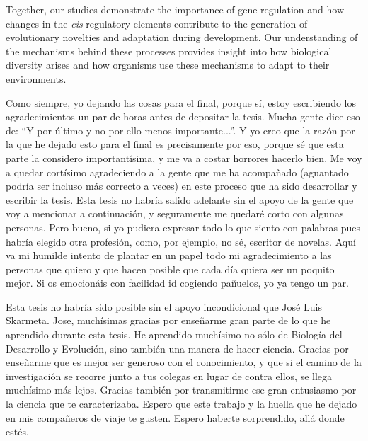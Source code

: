 \documentclass[
11pt, %
english, %
singlespacing, %
headsepline, %
chapterinoneline, %
]{MastersDoctoralThesis} %
\begin{document}
\begin{abstractLite}
Together, our studies demonstrate the importance of gene regulation and how changes in the \textit{cis} regulatory elements contribute to the generation of evolutionary novelties and adaptation during development. Our understanding of the mechanisms behind these processes provides insight into how biological diversity arises and how organisms use these mechanisms to adapt to their environments.
\end{abstractLite}






\begin{acknowledgements}
\addchaptertocentry{\acknowledgementname} %
Como siempre, yo dejando las cosas para el final, porque sí, estoy escribiendo los agradecimientos un par de horas antes de depositar la tesis. Mucha gente dice eso de: “Y por último y no por ello menos importante...”. Y yo creo que la razón por la que he dejado esto para el final es precisamente por eso, porque sé que esta parte la considero importantísima, y me va a costar horrores hacerlo bien. Me voy a quedar cortísimo agradeciendo a la gente que me ha acompañado (aguantado podría ser incluso más correcto a veces) en este proceso que ha sido desarrollar y escribir la tesis. Esta tesis no habría salido adelante sin el apoyo de la gente que voy a mencionar a continuación, y seguramente me quedaré corto con algunas personas. Pero bueno, si yo pudiera expresar todo lo que siento con palabras pues habría elegido otra profesión, como, por ejemplo, no sé, escritor de novelas. Aquí va mi humilde intento de plantar en un papel todo mi agradecimiento a las personas que quiero y que hacen posible que cada día quiera ser un poquito mejor. Si os emocionáis con facilidad id cogiendo pañuelos, yo ya tengo un par.  

Esta tesis no habría sido posible sin el apoyo incondicional que José Luis Skarmeta. Jose, muchísimas gracias por enseñarme gran parte de lo que he aprendido durante esta tesis. He aprendido muchísimo no sólo de Biología del Desarrollo y Evolución, sino también una manera de hacer ciencia. Gracias por enseñarme que es mejor ser generoso con el conocimiento, y que si el camino de la investigación se recorre junto a tus colegas en lugar de contra ellos, se llega muchísimo más lejos. Gracias también por transmitirme ese gran entusiasmo por la ciencia que te caracterizaba. Espero que este trabajo y la huella que he dejado en mis compañeros de viaje te gusten. Espero haberte sorprendido, allá donde estés. 


\end{acknowledgements}
\end{document}
